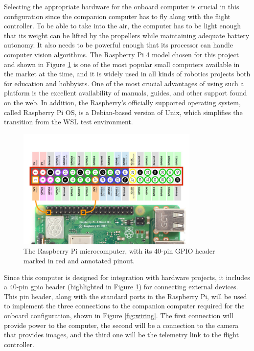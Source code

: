 Selecting the appropriate hardware for the onboard computer is crucial in this configuration since the companion computer has to fly along with the flight controller. 
To be able to take into the air, the computer has to be light enough that its weight can be lifted by the propellers while maintaining adequate battery autonomy.
It also needs to be powerful enough that its processor can handle computer vision algorithms.
The Raspberry Pi 4 model chosen for this project and shown in Figure \ref{fig:rpi4-pinout} is one of the most popular small computers available in the market at the time, and it is widely used in all kinds of robotics projects both for education and hobbyists. 
One of the most crucial advantages of using such a platform is the excellent availability of manuals, guides, and other support found on the web. 
In addition, the Raspberry’s officially supported operating
system, called Raspberry Pi OS, is a Debian-based version of Unix, which simplifies the transition from the WSL test environment.

\begin{figure}[H]
  \centering
  \includegraphics[width=0.8\textwidth,keepaspectratio]{img/rpi4-pinout.png}
  \caption{The Raspberry Pi microcomputer, with its 40-pin GPIO header marked in red and annotated pinout.}
  \label{fig:rpi4-pinout}
\end{figure}

Since this computer is designed for integration with hardware projects, it includes a 40-pin \acrfull{gpio} header (highlighted in Figure \ref{fig:rpi4-pinout}) for connecting external devices.
This pin header, along with the standard ports in the Raspberry Pi, will be used to implement the three connections to the companion computer required for the onboard configuration, shown in Figure \ref{fig:wiring}.
The first connection will provide power to the computer, the second will be a connection to the camera that provides images, and the third one will be the telemetry link to the flight controller.

